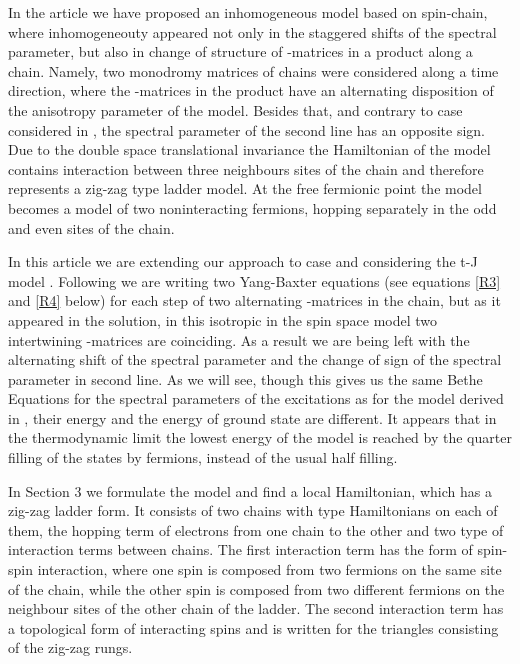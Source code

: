 \documentclass[a4paper,12pt]{article}
\begin{document}
In the article \cite{APSS} we have proposed an inhomogeneous model
based on \coordHE{} spin-chain, where inhomogeneouty appeared not
only in the staggered shifts of the spectral parameter, but
also in change of structure of \coordHE{}-matrices in a product along
a chain. Namely, two monodromy matrices of chains \coordHE{} were
considered along a time direction, where the \coordHE{}-matrices in the 
product have an alternating disposition of the anisotropy
parameter \myHighlight{$\pm \Delta$}\coordHE{} of the \coordHE{} model.
Besides that, and contrary to case considered in \cite{FLec,ZV,ZV1,FR},
the spectral parameter of the second line has an opposite sign.
Due to the double space translational invariance the Hamiltonian of 
the model contains interaction between three neighbours sites
of the chain and  therefore represents a zig-zag type ladder
model. At the free fermionic point \coordHE{} the model becomes
 a model of two noninteracting fermions, hopping separately
in the odd and even sites of the chain.

In this article we are extending our approach to \coordHE{} case
and considering the t-J model \cite{AK,U,L,S,KOR,BBO,EK}. 
Following \cite{APSS}
we are writing two Yang-Baxter equations \coordHE{} (see equations \ref{R3}
and \ref{R4} below) for each step of two alternating \coordHE{}-matrices
in the chain, but as it appeared in the solution, in this isotropic
in the spin space model two intertwining \coordHE{}-matrices are coinciding.
As a result we are being left with the alternating shift of the 
spectral parameter and the change of sign of the spectral parameter in
 second line. As we will see, though this gives us the same Bethe 
Equations \coordHE{} for the spectral parameters of the excitations
as for the model derived in \cite{ZV,ZV1,FR}, 
their energy and the energy of ground state are different. It appears
that in the thermodynamic limit the lowest energy of the model is
reached by the quarter filling of the states by  
fermions, instead of the usual half filling. 

In Section 3 we formulate the model and find a local Hamiltonian,
which has a zig-zag ladder form. It consists of two chains with \coordHE{}
type Hamiltonians on each of them, the hopping term of electrons
from one chain to the other and two type of interaction terms between 
chains. The first interaction term has the form of spin-spin 
interaction, where one spin is composed from two fermions 
on the same site of the chain, while the other spin is composed
from two different fermions on the neighbour sites of the other chain
of the ladder. The second interaction term has a topological form
of interacting spins and is written for the triangles consisting
of the zig-zag rungs.
\end{document}
